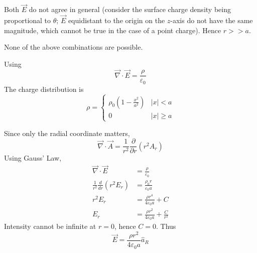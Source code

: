 \documentclass[answers]{exam}
\begin{document}
\begin{questions}
\begin{solution}
	Both $\vec{E}$ do not agree in general (consider the surface charge density being proportional to $\theta$; $\vec{E}$ equidistant to the origin on the $z$-axis do not have the same magnitude, which cannot be true in the case of a point charge). Hence $r>>a$.
\end{solution}


\begin{solution}
	None of the above combinations are possible.
\end{solution}


\begin{solution}
	Using
	$$\vec{\nabla}\cdot\vec{E} = \frac{\rho}{\varepsilon_0}$$
	The charge distribution is
	$$\rho = \begin{cases} \rho_0\left(1 - \frac{x^2}{a^2}\right) & |x|<a \\ 0 & |x|\geq a\end{cases}$$
\end{solution}


\begin{solution}
	Since only the radial coordinate matters,
	$$\vec{\nabla}\cdot\vec{A} = \frac{1}{r^2}\frac{\partial}{\partial r}\left(r^2A_r\right)$$
	Using Gauss' Law,
	\begin{align*}
		\vec{\nabla}\cdot\vec{E} &= \frac{\rho}{\varepsilon_0} \\
		\frac{1}{r^2}\frac{d}{dr}\left(r^2E_r\right) &= \frac{\rho_0r}{\varepsilon_0a} \\
		r^2E_r &= \frac{\rho r^4}{4\varepsilon_0a} + C \\
		E_r &= \frac{\rho r^2}{4\varepsilon_0a} + \frac{C}{r^2}
	\end{align*}
	Intensity cannot be infinite at $r=0$, hence $C=0$. Thus
	$$\vec{E} = \frac{\rho r^2}{4\varepsilon_0a}\hat{a}_R$$
\end{solution}


\end{questions}
\end{document}
